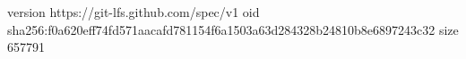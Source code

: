 version https://git-lfs.github.com/spec/v1
oid sha256:f0a620eff74fd571aacafd781154f6a1503a63d284328b24810b8e6897243c32
size 657791
